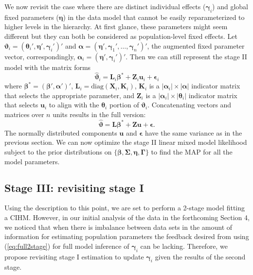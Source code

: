 \documentclass[12pt]{article}
\newcommand{\bt}{\boldsymbol{\theta}}
\newcommand{\bvt}{\boldsymbol{\vartheta}}
\newcommand{\bb}{\boldsymbol{\beta}}
\newcommand{\bn}{\boldsymbol{\eta}}
\newcommand{\bg}{\boldsymbol{\gamma}}
\newcommand{\bG}{\boldsymbol{\Gamma}}
\newcommand{\bSig}{\boldsymbol{\Sigma}}
\newcommand{\ba}{\boldsymbol{\alpha}}
\newcommand{\bL}{\mathbf{L}}
\newcommand{\bK}{\mathbf{K}}
\newcommand{\bX}{\mathbf{X}}
\newcommand{\bZ}{\mathbf{Z}}
\newcommand{\bu}{\mathbf{u}}
\begin{document}
We now revisit the case where there are distinct individual effects ($\bg_i$) and global fixed parameters ($\bn$) in the data model that cannot be easily reparameterized to higher levels in the hierarchy. At first glance, these parameters might seem different but they can both be considered as population-level fixed effects. Let $\bvt_i = (\bt_i', \bn', \bg_i')'$ and $\ba = (\bn', \bg_1',\dots,\bg_n')'$, the augmented fixed parameter vector, correspondingly, $\ba_i = (\bn', \bg_i')'$. Then we can still represent the stage II model with the matrix forms
\[
\hat{\bvt}_i = \bL_i\bb^* + \bZ_i\bu_i + \boldsymbol{\epsilon}_i
\]
where $\bb^* = (\bb', \ba')'$, $\bL_i = \text{diag}(\bX_i, \bK_i)$, $\bK_i$ is a $|\ba_i|\times |\ba|$ indicator matrix that selects the appropriate parameter, and $\bZ_i$ is a $|\ba_i|\times |\bt_i|$ indicator matrix that selects $\bu_i$ to align with the $\bt_i$ portion of $\bvt_i$. Concatenating vectors and matrices over $n$ units results in  the full version:
\begin{equation}\label{eq:full2stage}
\hat{\bvt} = \bL\bb^* + \bZ\bu + \boldsymbol{\epsilon}.
\end{equation}
The normally distributed components $\bu$ and $\boldsymbol{\epsilon}$ have the same variance as in the previous section. We can now optimize the stage II linear mixed model likelihood subject to the prior distributions on $\{\bb, \bSig, \bn, \bG\}$ to find the MAP for all the model parameters.   


\subsection{Stage III: revisiting stage I}  

Using the description to this point, we are set to perform a 2-stage model fitting a CIHM. However, in our initial analysis of the data in the forthcoming Section 4, we noticed that when there is imbalance between data sets in the amount of information for estimating population parameters the feedback desired from using (\ref{eq:full2stage}) for full model inference of $\bg_i$ can be lacking. Therefore, we propose revisiting stage I estimation to update $\bg_i$ given the results of the second stage. 
\end{document}
